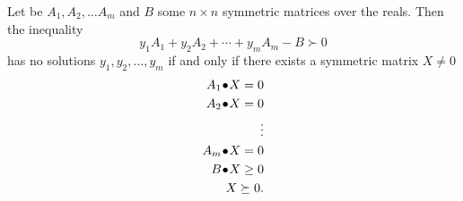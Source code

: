 \documentclass[a4paper,twoside,justified]{tufte-handout}
\begin{document}
\begin{lemma}
  \label{lmm:farkas_sdp}
  Let be $A_{1}, A_{2}, \ldots A_{m}$ and $B$ some $n \times n$
  symmetric matrices over the reals. Then the inequality
  \begin{equation}
    y_{1}A_{1}+y_{2}A_{2} + \cdots + y_{m}A_{m} - B \succ 0
  \end{equation}
  has no solutions $ y_{1}, y_{2}, \ldots,y_{m} $ if and only if there
  exists a symmetric matrix $ X\not=0 $
\begin{alignat*}{2}
  \pointwiseprod{A_{1}}{X} = 0\\
   \pointwiseprod{A_{2}}{X} = 0\\
   \vdots \\
   \pointwiseprod{A_{m}}{X} = 0 \\
   \pointwiseprod{B}{X} \geq 0\\
   X \succeq 0.
\end{alignat*}
\end{lemma}
\end{document}
